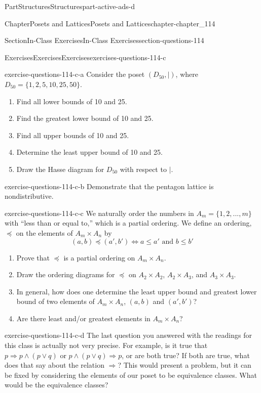 \documentclass[oneside,10pt,]{book}
\numberwithin{equation}{section}
\begin{document}
\begin{partptx}{Part}{Structures}{}{Structures}{}{}{part-active-ads-d}
\begin{chapterptx}{Chapter}{Posets and Lattices}{}{Posets and Lattices}{}{}{chapter-chapter_114}
\begin{sectionptx}{Section}{In-Class Exercises}{}{In-Class Exercises}{}{}{section-questions-114}
\begin{exercises-subsection-numberless}{Exercises}{Exercises}{}{Exercises}{}{}{exercises-questions-114-c}
\begin{divisionexercise}{1}{}{}{exercise-questions-114-c-a}%
Consider the poset \((D_{50},\mid)\), where \(D_{50} = \{1,2,5,10,25,50\}\).%
\begin{enumerate}[label=(\alph*)]
\item{}Find all lower bounds of 10 and 25.%
\item{}Find the greatest lower bound  of 10 and 25.%
\item{}Find all upper bounds of 10 and 25.%
\item{}Determine the least upper bound  of 10 and 25.%
\item{}Draw the Hasse diagram for \(D_{50}\) with respect to \(\mid\).%
\end{enumerate}
%
\end{divisionexercise}%
\begin{divisionexercise}{2}{}{}{exercise-questions-114-c-b}%
Demonstrate that the pentagon lattice is nondistributive.%
\end{divisionexercise}%
\begin{divisionexercise}{3}{}{}{exercise-questions-114-c-c}%
We naturally order the numbers in \(A_m = \{1, 2, . . . , m\}\) with ``less than or equal to,'' which is a partial ordering. We define an ordering, \(\preceq\)  on the elements of \(A_m \times  A_n\) by%
\begin{equation*}
(a, b) \preceq  (a', b') \Leftrightarrow a \leq  a' \textrm{ and } b \leq  b'
\end{equation*}
%
\begin{enumerate}[label=(\alph*)]
\item{}Prove that \(\preceq\) is a partial ordering on \(A_m \times  A_n\).%
\item{}Draw the ordering diagrams for \(\preceq\) on \(A_2 \times  A_2\), \(A_2\times  A_3\), and \(A_3 \times  A_3\).%
\item{}In general, how does one determine the least upper bound  and greatest lower bound of two elements of \(A_m \times  A_n\), \((a, b)\) and \((a',b')\)?%
\item{}Are there least and\slash{}or greatest elements in \(A_m \times  A_n\)?%
\end{enumerate}
%
\end{divisionexercise}%
\begin{divisionexercise}{4}{}{}{exercise-questions-114-c-d}%
The last question you answered with the readings for this class is actually not very precise.  For example,  is it true that  \(p \Rightarrow p\land(p \lor q)\) or  \(p\land(p \lor q) \Rightarrow p\), or are both true?  If both are true, what does that say about the relation \(\Rightarrow\)?   This would present a problem, but it can be fixed by considering the elements of our poset to be equivalence classes.  What would be the equivalence classes?%

\end{divisionexercise}
\end{exercises-subsection-numberless}
\end{sectionptx}
\end{chapterptx}
\end{partptx}
\end{document}
